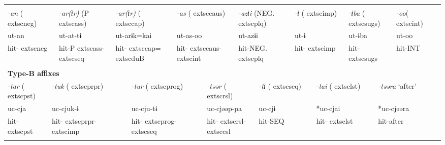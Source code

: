 \tabletail{}
\tablelasttail{}
\begin{tabularx}{\textwidth}{XXm{}XXXXXXXXXXXXXXXXXXXX}
\lsptoprule
\multicolumn{23}{X}{{\bfseries Type-A affixes}}\\
\multicolumn{3}{X}{{ \textit{{}-an} (	extsc{neg})}} & \multicolumn{3}{X}{{ \textit{{}-ar(ɨr)} (P	extsc{ass})}} & \multicolumn{4}{X}{{ \textit{{}-ar(ɨr)} (	extsc{cap})}} & \multicolumn{4}{X}{{ \textit{{}-as} (	extsc{caus})}} & \multicolumn{3}{X}{{ \textit{{}-azɨi} (NEG.	extsc{plq})}} & \multicolumn{2}{X}{{ \textit{{}-ɨ} (	extsc{imp})}} & \multicolumn{2}{X}{{ \textit{{}-ɨba} (	extsc{sugs})}} & { \textit{{}-oo}(	extsc{int})} & \\
\multicolumn{3}{X}{{ ut-an}} & \multicolumn{3}{X}{{ ut-at-tɨ}} & \multicolumn{4}{X}{{ ut-arɨk=kai}} & \multicolumn{4}{X}{{ ut-as-oo}} & \multicolumn{3}{X}{{ ut-azɨi}} & \multicolumn{2}{X}{{ ut-ɨ}} & \multicolumn{2}{X}{{ ut-ɨba}} & { ut-oo} & \\
\multicolumn{3}{X}{hit-	extsc{neg}} & \multicolumn{3}{X}{hit-P	extsc{ass}-	extsc{seq}} & \multicolumn{4}{X}{hit-	extsc{cap}=	extsc{du}B} & \multicolumn{4}{X}{hit-	extsc{caus}-	extsc{int}} & \multicolumn{3}{X}{hit-NEG.	extsc{plq}} & \multicolumn{2}{X}{hit-	extsc{imp}} & \multicolumn{2}{X}{hit-	extsc{sugs}} & hit-INT & \\
\multicolumn{23}{X}{}\\
\multicolumn{23}{X}{{\bfseries Type-B affixes}}\\
\multicolumn{2}{X}{{ \textit{{}-tar} (	extsc{pst})}} & \multicolumn{6}{X}{{ \textit{{}-tuk} (	extsc{prpr})}} & \multicolumn{3}{X}{{ \textit{{}-tur} (	extsc{prog})}} & \multicolumn{4}{X}{{ \textit{{}-təər} (	extsc{rsl})}} & \multicolumn{3}{X}{{ \textit{{}-tɨ} (	extsc{seq})}} & \multicolumn{2}{X}{{ \textit{{}-tai} (	extsc{lst})}} & \multicolumn{3}{X}{{ \textit{{}-təəra} ‘after’}}\\
\multicolumn{2}{X}{{ uc-cja}} & \multicolumn{6}{X}{{ uc-cjuk-ɨ}} & \multicolumn{3}{X}{{ uc-cju-tɨ}} & \multicolumn{4}{X}{{ uc-cjəəp-pa}} & \multicolumn{3}{X}{{ uc-cjɨ}} & \multicolumn{2}{X}{{ *uc-cjai}} & \multicolumn{3}{X}{{ *uc-cjəəra}}\\
\multicolumn{2}{X}{hit-	extsc{pst}} & \multicolumn{6}{X}{hit-	extsc{prpr}-	extsc{imp}} & \multicolumn{3}{X}{hit-	extsc{prog}-	extsc{seq}} & \multicolumn{4}{X}{hit-	extsc{rsl}-	extsc{csl}} & \multicolumn{3}{X}{hit-SEQ} & \multicolumn{2}{X}{hit-	extsc{lst}} & \multicolumn{3}{X}{{ hit-after}}\\
\multicolumn{2}{X}{} & \multicolumn{6}{X}{} & \multicolumn{3}{X}{} & \multicolumn{4}{X}{} & \multicolumn{3}{X}{} & \multicolumn{2}{X}{} & \multicolumn{3}{X}{}\\

\end{tabularx}
